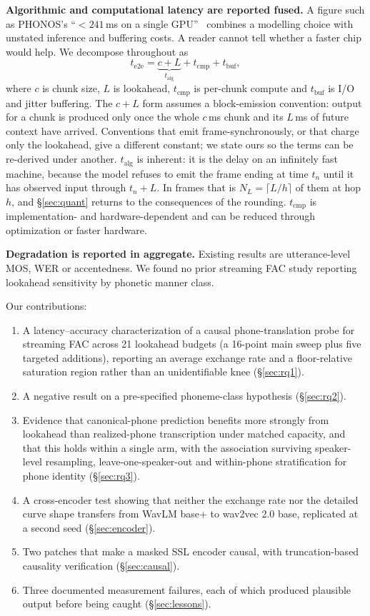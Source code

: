 \documentclass[journal]{IEEEtran}
\newcommand{\talg}{\ensuremath{t_{\mathrm{alg}}}}
\newcommand{\tcmp}{\ensuremath{t_{\mathrm{cmp}}}}
\newcommand{\tbuf}{\ensuremath{t_{\mathrm{buf}}}}
\begin{document}
\textbf{Algorithmic and computational latency are reported fused.} A figure
such as PHONOS's ``${<}241$\,ms on a single GPU''~\cite{phonos2026} combines a
modelling choice with
unstated inference and buffering costs. A reader cannot tell whether a faster
chip would help. We decompose throughout as
\begin{equation}
t_{\mathrm{e2e}} = \underbrace{c + L}_{t_{\mathrm{alg}}} + t_{\mathrm{cmp}} + t_{\mathrm{buf}},
\label{eq:decomp}
\end{equation}
where $c$ is chunk size, $L$ is lookahead, \tcmp{} is per-chunk compute and
\tbuf{} is I/O and jitter buffering. The $c{+}L$ form assumes a block-emission
convention: output for a chunk is produced only once the whole $c$\,ms chunk
and its $L$\,ms of future context have arrived. Conventions that emit
frame-synchronously, or that charge only the lookahead, give a different
constant; we state ours so the terms can be re-derived under another. \talg{} is inherent: it is the delay on an
infinitely fast machine, because the model refuses to emit the frame ending at
time $t_n$ until it has observed input through $t_n{+}L$. In frames that is
$N_L=\lceil L/h\rceil$ of them at hop $h$, and \S\ref{sec:quant} returns to the
consequences of the rounding. \tcmp{} is implementation- and hardware-dependent and can be
reduced through optimization or faster hardware.

\textbf{Degradation is reported in aggregate.} Existing results are
utterance-level MOS, WER or accentedness. We found no prior streaming FAC study
reporting lookahead sensitivity by phonetic manner class.

Our contributions:
\begin{enumerate}\itemsep1pt
\item A latency--accuracy characterization of a causal phone-translation probe
      for streaming FAC across 21 lookahead budgets (a 16-point main sweep
      plus five targeted additions), reporting an average
      exchange rate and a floor-relative saturation region rather than an
      unidentifiable knee (\S\ref{sec:rq1}).
\item A negative result on a pre-specified phoneme-class hypothesis
      (\S\ref{sec:rq2}).
\item Evidence that canonical-phone prediction benefits more strongly from
      lookahead than realized-phone transcription under matched capacity, and
      that this holds within a single arm, with the association surviving
      speaker-level resampling, leave-one-speaker-out and within-phone
      stratification for
      phone identity (\S\ref{sec:rq3}).
\item A cross-encoder test showing that neither the exchange rate nor the
      detailed curve shape transfers from WavLM base+ to wav2vec 2.0 base,
      replicated at a second seed (\S\ref{sec:encoder}).
\item Two patches that make a masked SSL encoder causal, with
      truncation-based causality verification (\S\ref{sec:causal}).
\item Three documented measurement failures, each of which produced plausible
      output before being caught (\S\ref{sec:lessons}).
\end{enumerate}
\end{document}
